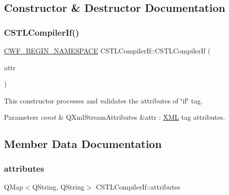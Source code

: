 \subsection{Constructor \& Destructor Documentation}
\mbox{\label{class_c_s_t_l_compiler_if_a6d9ff3428d392123f5139d8ca65e5322}} 
\subsubsection{\texorpdfstring{C\+S\+T\+L\+Compiler\+If()}{CSTLCompilerIf()}}
{\footnotesize\ttfamily \hyperlink{cppwebframework__global_8h_a7492e9498cbaf9cd17dbc2215d3a0e48}{C\+W\+F\+\_\+\+B\+E\+G\+I\+N\+\_\+\+N\+A\+M\+E\+S\+P\+A\+CE} C\+S\+T\+L\+Compiler\+If\+::\+C\+S\+T\+L\+Compiler\+If (\begin{DoxyParamCaption}\item[{const Q\+Xml\+Stream\+Attributes \&}]{attr }\end{DoxyParamCaption})\hspace{0.3cm}{\ttfamily [explicit]}}



This constructor processes and validates the attributes of \char`\"{}if\char`\"{} tag. 


\begin{DoxyParams}{Parameters}
{\em const} & Q\+Xml\+Stream\+Attributes \&attr \+: \hyperlink{namespace_x_m_l}{X\+ML} tag attributes. \\
\hline
\end{DoxyParams}


\subsection{Member Data Documentation}
\mbox{\label{class_c_s_t_l_compiler_if_a6bf7af6ef1a5c9c5f0654b6873ffe6d0}} 
\subsubsection{\texorpdfstring{attributes}{attributes}}
{\footnotesize\ttfamily Q\+Map$<$Q\+String, Q\+String$>$ C\+S\+T\+L\+Compiler\+If\+::attributes}

